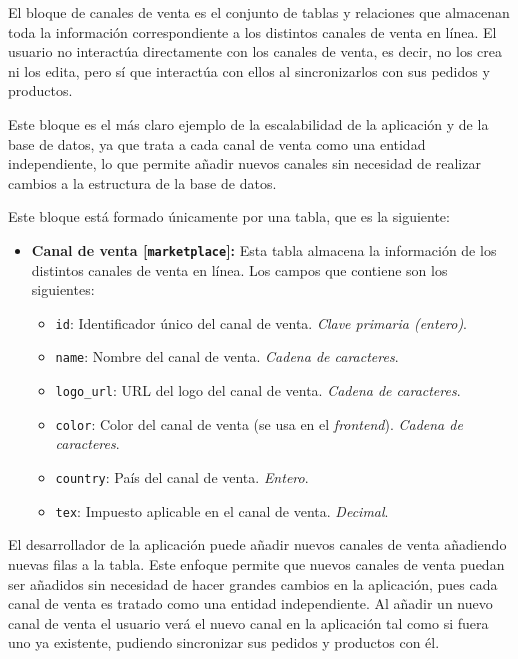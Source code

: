 El bloque de canales de venta es el conjunto de tablas y relaciones que almacenan toda la información correspondiente a los distintos canales de venta en línea. El usuario no interactúa directamente con los canales de venta, es decir, no los crea ni los edita, pero sí que interactúa con ellos al sincronizarlos con sus pedidos y productos.

Este bloque es el más claro ejemplo de la escalabilidad de la aplicación y de la base de datos, ya que trata a cada canal de venta como una entidad independiente, lo que permite añadir nuevos canales sin necesidad de realizar cambios a la estructura de la base de datos.

Este bloque está formado únicamente por una tabla, que es la siguiente:
\begin{itemize}
    \item \textbf{Canal de venta [\texttt{marketplace}]:} Esta tabla almacena la información de los distintos canales de venta en línea. Los campos que contiene son los siguientes:
          \begin{itemize}
              \item \texttt{id}: Identificador único del canal de venta. \textit{Clave primaria (entero)}.
              \item \texttt{name}: Nombre del canal de venta. \textit{Cadena de caracteres}.
              \item \texttt{logo\_url}: URL del logo del canal de venta. \textit{Cadena de caracteres}.
              \item \texttt{color}: Color del canal de venta (se usa en el \textit{frontend}). \textit{Cadena de caracteres}.
              \item \texttt{country}: País del canal de venta. \textit{Entero}.
              \item \texttt{tex}: Impuesto aplicable en el canal de venta. \textit{Decimal}.
          \end{itemize}
\end{itemize}

El desarrollador de la aplicación puede añadir nuevos canales de venta añadiendo nuevas filas a la tabla. Este enfoque permite que nuevos canales de venta puedan ser añadidos sin necesidad de hacer grandes cambios en la aplicación, pues cada canal de venta es tratado como una entidad independiente. Al añadir un nuevo canal de venta el usuario verá el nuevo canal en la aplicación tal como si fuera uno ya existente, pudiendo sincronizar sus pedidos y productos con él.

